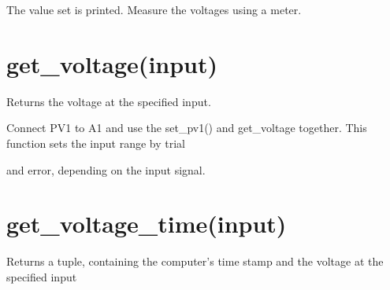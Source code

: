 \documentclass[a4paper,12pt,english]{sphinxmanual}
\begin{document}
\begin{sphinxVerbatim}[commandchars=\\\{\}]
 
 
\end{sphinxVerbatim}

The value set is printed. Measure the voltages using a meter.


\section{get\_voltage(input)}
\label{\detokenize{9.0:get-voltage-input}}
Returns the voltage at the specified input.

\begin{sphinxVerbatim}[commandchars=\\\{\}]
 
 
 
 
 
\end{sphinxVerbatim}

Connect PV1 to A1 and use the set\_pv1() and get\_voltage together. This
function sets the input range by trial

and error, depending on the input signal.


\section{get\_voltage\_time(input)}
\label{\detokenize{9.0:get-voltage-time-input}}
Returns a tuple, containing the computer’s time stamp and the voltage at
the specified input

\begin{sphinxVerbatim}[commandchars=\\\{\}]
 
\end{sphinxVerbatim}
\end{document}
